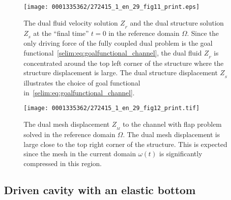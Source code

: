 \begin{figure}[!p]
  \centering
\texttt{[image: 0001335362/272415\_1\_en\_29\_fig11\_print.eps]}
  \caption{The dual fluid velocity solution $Z_{_{F}}$ and the dual
    structure solution $Z_{_{S}}$ at the ``final time'' $t=0$ in the
    reference domain $\Omega$.  Since the only driving force of the
    fully coupled dual problem is the goal
    functional~\eqref{selim:eq:goalfunctional_channel}, the dual fluid
    $Z_{_{F}}$ is concentrated around the top left corner of the
    structure where the structure displacement is large. The dual
    structure displacement $Z_{_{S}}$ illustrates the choice of goal
    functional in~\eqref{selim:eq:goalfunctional_channel}.}
\label{selim:fig:dual_channel_1}\vspace*{8pt}
\end{figure}

\begin{figure}[!p]
\centering
\texttt{[image: 0001335362/272415\_1\_en\_29\_fig12\_print.tif]}
\caption{The dual mesh displacement $Z_{_{M}}$ to the channel with
    flap problem solved in the reference domain $\Omega$. The dual mesh
      displacement is large close to the top right corner of the
      structure. This is expected since the mesh in the current domain
      $\omega(t)$ is significantly compressed in this region.}
\label{selim:fig:dual_channel_2}
\end{figure}

\subsection{Driven cavity with an elastic bottom}

